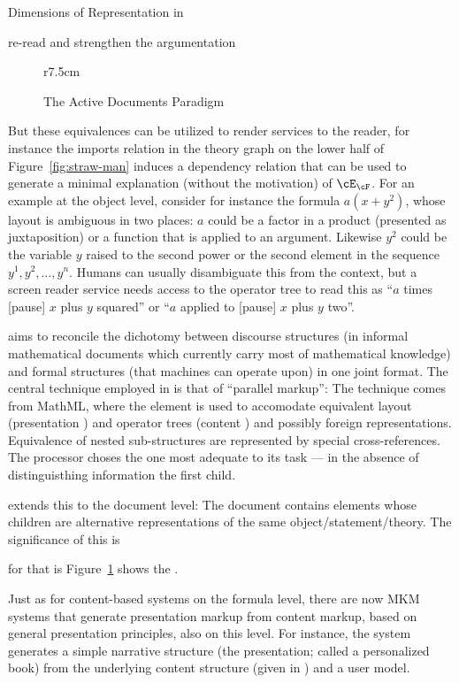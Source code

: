 \begin{omgroup}[id=syntax-semantics]{Dimensions of Representation in \omdoc}
\begin{newpart}{re-read and strengthen the argumentation}
\begin{figure}r{7.5cm}\vspace*{-1em}
\caption{The Active Documents Paradigm}\label{fig:adp}\vspace*{-1em}
\end{figure}
But these equivalences can be utilized to render services to the reader, for instance the
imports relation in the theory graph on the lower half of Figure~\ref{fig:straw-man}
induces a dependency relation that can be used to generate a minimal explanation (without
the motivation) of $\cE_\cF$.  For an example at the object level, consider for instance
the formula $a(x+y^2)$, whose layout is ambiguous in two places: $a$ could be a factor in
a product (presented as juxtaposition) or a function that is applied to an
argument. Likewise $y^2$ could be the variable $y$ raised to the second power or the
second element in the sequence $y^1,y^2,\ldots,y^n$. Humans can usually disambiguate this
from the context, but a screen reader service needs access to the operator tree to read
this as ``$a$ times [pause] $x$ plus $y$ squared'' or ``$a$ applied to [pause] $x$ plus
$y$ two''.

\omdoc aims to reconcile the dichotomy between discourse structures (in informal
mathematical documents which currently carry most of mathematical knowledge) and formal
structures (that machines can operate upon) in one joint format. The central technique
employed in \omdoc is that of ``parallel markup'': The technique comes from MathML, where
the  element is used to accomodate equivalent layout (presentation
{\mathml}) and operator trees (content {\mathml}) and possibly foreign
representations. Equivalence of nested sub-structures are represented by special
cross-references.  The \mathml processor choses the one most adequate to its task --- in
the absence of distinguisthing information the first child.

\omdoc extends this to the document level: The document contains elements whose children
are alternative representations of the same object/statement/theory. The significance of this is

for that is Figure~\ref{fig:adp} shows the .


Just as for content-based systems on the formula level, there are now MKM systems that
generate presentation markup from content markup, based on general presentation
principles, also on this level. For instance, the {}
system~\cite{MelBue:krma03} generates a simple narrative structure (the
presentation; called a personalized book) from the underlying content structure (given in
\omdoc) and a user model.


\end{newpart}
\end{omgroup}
